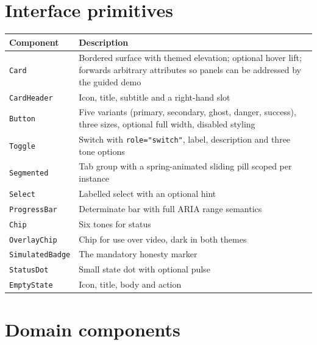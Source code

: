 \documentclass[11pt,a4paper]{report}
\newcommand{\code}[1]{\texttt{\small #1}}
\begin{document}
\section{Interface primitives}

\begin{longtable}{L{3.2cm} L{11.6cm}}
\toprule
\textbf{Component} & \textbf{Description} \\
\midrule
\endhead
\code{Card} & Bordered surface with themed elevation; optional hover lift;
  forwards arbitrary attributes so panels can be addressed by the guided
  demo \\
\code{CardHeader} & Icon, title, subtitle and a right-hand slot \\
\code{Button} & Five variants (primary, secondary, ghost, danger, success),
  three sizes, optional full width, disabled styling \\
\code{Toggle} & Switch with \code{role="switch"}, label, description and three
  tone options \\
\code{Segmented} & Tab group with a spring-animated sliding pill scoped per
  instance \\
\code{Select} & Labelled select with an optional hint \\
\code{ProgressBar} & Determinate bar with full ARIA range semantics \\
\code{Chip} & Six tones for status \\
\code{OverlayChip} & Chip for use over video, dark in both themes \\
\code{SimulatedBadge} & The mandatory honesty marker \\
\code{StatusDot} & Small state dot with optional pulse \\
\code{EmptyState} & Icon, title, body and action \\
\bottomrule
\end{longtable}

\section{Domain components}
\end{document}
